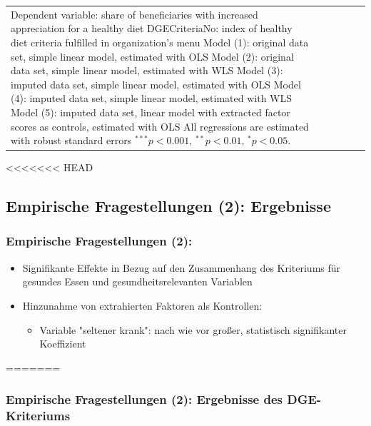 \begin{frame}[fragile]
\begin{itemize}
\begin{frame}[fragile]
\begin{table}
\begin{center}
{\begin{tabular}{l c c c c c }
{{{\vspace{2pt} Dependent variable: share of beneficiaries with increased appreciation for a healthy diet \\ DGECriteriaNo: index of healthy diet criteria fulfilled in organization's menu \\ Model (1): original data set, simple linear model, estimated with OLS \\ Model (2): original data set, simple linear model, estimated with WLS \\ Model (3): imputed data set, simple linear model, estimated with OLS \\ Model (4): imputed data set, simple linear model, estimated with WLS \\ Model (5): imputed data set, linear model with extracted factor scores as controls, estimated with OLS \\ All regressions are estimated with robust standard errors $^{***}p<0.001$, $^{**}p<0.01$, $^*p<0.05$.}}}
\end{tabular}
}
\label{HealthRegressions-AppreciateHealthy}
\end{center}
\end{table}

\end{frame}

<<<<<<< HEAD
\subsection{Empirische Fragestellungen (2): Ergebnisse}

\begin{frame}
\frametitle{Empirische Fragestellungen (2): }


\begin{itemize}
\item Signifikante Effekte in Bezug auf den Zusammenhang des Kriteriums für gesundes Essen und gesundheitsrelevanten Variablen 
\item Hinzunahme von extrahierten Faktoren als Kontrollen:
\begin{itemize}
\item Variable "seltener krank": nach wie vor großer, statistisch signifikanter Koeffizient
\end{itemize}
\end{itemize}
\end{frame}

=======
\begin{frame}
\frametitle{Empirische Fragestellungen (2): Ergebnisse des DGE-Kriteriums}


\end{frame}
\end{itemize}
\end{frame}
